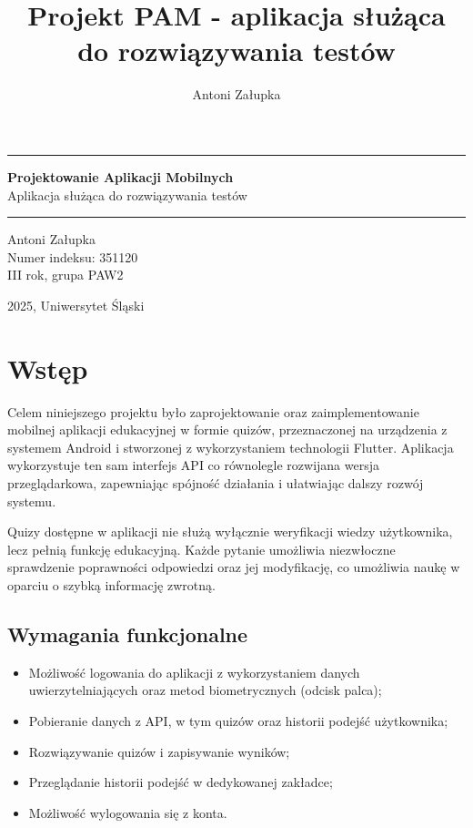 \documentclass{article}
\title{Projekt PAM - aplikacja służąca do rozwiązywania testów}
\author{Antoni Załupka}
\begin{document}
	\thispagestyle{empty}
	
	
	\vspace{4cm}
	
	\rule{\linewidth}{2mm} 
	
	\begin{center}
		\huge \textbf{Projektowanie Aplikacji Mobilnych} \\
		\huge {Aplikacja służąca do rozwiązywania testów} \\
	\end{center}
	
	\rule{\linewidth}{0.5mm} 
	
	\vspace{2cm}
	
	\begin{center}
		\Large{Antoni Załupka} \\
		\Large{Numer indeksu: 351120} \\
		\Large{III rok, grupa PAW2} \\
		
	\end{center}
	
	
	\vspace{15cm}
	
	\begin{center}
		\Large{2025, Uniwersytet Śląski}
	\end{center}
	
	\newpage
	
	\section{Wstęp}
	Celem niniejszego projektu było zaprojektowanie oraz zaimplementowanie mobilnej aplikacji edukacyjnej w formie quizów, przeznaczonej na urządzenia z systemem Android i stworzonej z wykorzystaniem technologii Flutter. Aplikacja wykorzystuje ten sam interfejs API co równolegle rozwijana wersja przeglądarkowa, zapewniając spójność działania i ułatwiając dalszy rozwój systemu.
	
	Quizy dostępne w aplikacji nie służą wyłącznie weryfikacji wiedzy użytkownika, lecz pełnią funkcję edukacyjną. Każde pytanie umożliwia niezwłoczne sprawdzenie poprawności odpowiedzi oraz jej modyfikację, co umożliwia naukę w oparciu o szybką informację zwrotną.
	
	\subsection*{Wymagania funkcjonalne}
	\begin{itemize}
		\item Możliwość logowania do aplikacji z wykorzystaniem danych uwierzytelniających oraz metod biometrycznych (odcisk palca);
		\item Pobieranie danych z API, w tym quizów oraz historii podejść użytkownika;
		\item Rozwiązywanie quizów i zapisywanie wyników;
		\item Przeglądanie historii podejść w dedykowanej zakładce;
		\item Możliwość wylogowania się z konta.
	\end{itemize}
	
\end{document}
